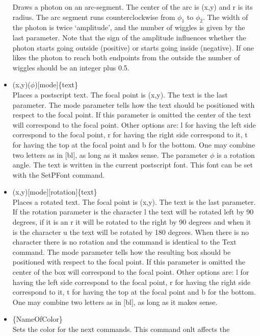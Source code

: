 \begin{itemize}
    Draws a photon on an arc-segment. The center of the arc is (x,y) and r 
    is its radius. The arc segment runs counterclockwise from $\phi_1$ 
    to $\phi_2$. The width of the photon is twice `amplitude', and the 
    number of wiggles is given by the last parameter. Note that 
    the sign of the amplitude influences whether the photon starts going 
    outside (positive) or starts going inside (negative). If one likes 
    the photon to reach both endpoints from the outside the number of 
    wiggles should be an integer plus 0.5.
\item {}(x,y)($\phi$)$[$mode$]$\{text\} \hfill \\
    Places a postscript text. The focal point is (x,y). The text is the last 
    parameter. The mode parameter tells how the text should be 
    positioned with respect to the focal point. If this parameter is 
    omitted the center of the text will correspond to the focal point. 
    Other options are: l for having the left side correspond to the 
    focal point, r for having the right side correspond to it, t for 
    having the top at the focal point and b for the bottom. One may 
    combine two letters as in $[$bl$]$, as long as it makes sense. The 
    parameter $\phi$ is a rotation angle. The text is written in the 
    current postscript font. This font can be set with the SetPFont 
    command.
\item {}(x,y)$[$mode$][$rotation$]$\{text\} \hfill \\
    Places a rotated text. The focal point is (x,y). The text is the last 
    parameter. If the rotation parameter is the character l the text 
    will be rotated left by 90 degrees, if it is an r it will be rotated 
    to the right by 90 degrees and when it is the character u the text 
    will be rotated by 180 degrees. When there is no character there is 
    no rotation and the command is identical to the Text command. 
    The mode parameter tells how the resulting box should be 
    positioned with respect to the focal point. If this parameter is 
    omitted the center of the box will correspond to the focal point. 
    Other options are: l for having the left side correspond to the 
    focal point, r for having the right side correspond to it, t for 
    having the top at the focal point and b for the bottom. One may 
    combine two letters as in $[$bl$]$, as long as it makes sense.
\item {}\{NameOfColor\} \hfill \\
    Sets the color for the next commands. This command onlt affects the 

\end{itemize}

